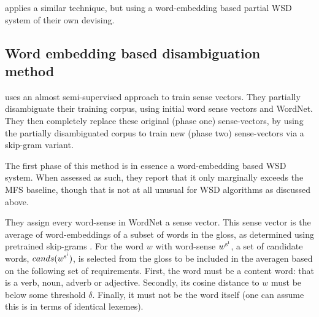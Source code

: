 \documentclass[12pt,parskip]{komatufte}
\begin{document}
 applies a similar technique, but using a word-embedding based partial WSD system of their own devising.


\subsection{Word embedding based disambiguation method}\label{sec:pseudo-semi-supervised-method}

\textcite{Chen2014} uses an almost semi-supervised approach to train sense vectors.
They partially disambiguate their training corpus, using initial word sense vectors and WordNet.
They then completely replace these original (phase one) sense-vectors, by using the partially disambiguated corpus to train new (phase two) sense-vectors via a skip-gram variant.


%

The first phase of this method is in essence a word-embedding based WSD system.
When assessed as such, they report that it only marginally exceeds the MFS baseline,
though that is not at all unusual for WSD algorithms as discussed above.

They assign every word-sense in WordNet a sense vector.
This sense vector is the average of word-embeddings of a subset of words in the gloss,
as determined using pretrained skip-grams \parencite{mikolov2013efficient}.
For the word $w$ with word-sense $\d w_{\n s_i}$,
a set of candidate words, $cands(\d w_{\n s_i})$, is selected from the gloss to be included in the averagen
based on the following set of requirements.
First, the word must be a content word: that is a verb, noun, adverb or adjective.
Secondly, its cosine distance to $w$ must be below some threshold $\delta$.
Finally, it must not be the word itself (one can assume this is in terms of identical lexemes).
\end{document}
